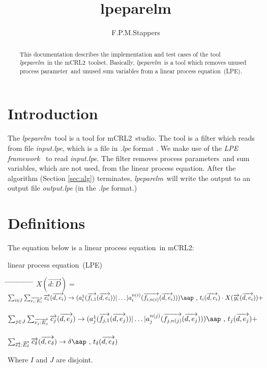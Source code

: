 \documentclass[a4paper,10pt]{article}
\title{lpeparelm}
\author{F.P.M.Stappers}
\theoremstyle{plain}
\theoremstyle{definition}
\newcommand{\mcrl}{mCRL2}
\newcommand{\lpe}{linear process equation}
\newcommand{\tool}{\textit{lpeparelm}}
\newcommand{\ti}{\textit}
\newcommand{\ovr}{\overrightarrow}
\newcommand{\pp}{process parameter}
\newcommand{\pps}{process parameters}
\newcommand{\framework}{\textit{LPE framework} \cite{LPEframework}}
\newcommand{\tab}{\hspace*{5.mm} \= \hspace*{5.mm} \= \hspace*{5.mm} \= \hspace*{5.mm} \= \hspace*{5.mm} \= \hspace*{5.mm}  \= \hspace*{5.mm}  \= \hspace*{5.mm}  \= \hspace*{5.mm} \= \hspace*{5.mm} \= \hspace*{5.mm}  \= \hspace*{5.mm}  \= \hspace*{5.mm}\kill}
\newcommand{\at}[1]{\mbox{\aap ,} #1}
\begin{document}
\maketitle

\begin{abstract}
This documentation describes the implementation and test cases of the tool \tool\ in  the \mcrl\ toolset.
Basically, \tool\ is a tool which removes unused \pp\ and unused sum variables from a \lpe\ (LPE).
\end{abstract}

\tableofcontents

\section{Introduction}
The \tool\ tool is a tool for \mcrl\ studio. The tool is a
filter which reads from file \ti{input.lpe}, which is
a file in \ti{.lpe} format \cite{LPEformat}. We make use of the
\framework\ to read \ti{input.lpe}. The filter removes \pps\ and sum variables, which are not used, from the
\lpe. After the algorithm (Section \ref{sec:alg}) terminates, \tool\
will write the output to an output file \ti{output.lpe} (in the \ti{.lpe} format.)


\section{Definitions} \label{sec:def}

The equation below is a \lpe\ in \mcrl : 
\begin{defn}\lpe\ (LPE) \newline
\begin{tabbing}
\tab
$X (\ovr{d: D}) = $ \> \> \> $ \sum_{i \in I} \sum_{\ovr{e_i: E_i}} \ovr{c_i} ( \ovr{d, e_i }) \rightarrow 
(a_i^1 (\ovr{f_{i,1}}(\ovr{d,e_i})) \vert \ldots \vert a_i^{n(i)}(\ovr{f_{i,n(i)}}(\ovr{d,e_i}))) \at \text{ } t_i(\ovr{d,e_i})  \cdot X(\ovr{g_i}(\ovr{d,e_i})) +$ \\ \\
\> \> \> $ \sum_{j \in J} \sum_{\ovr{e_j: E_j}} \ovr{c_j} ( \ovr{d, e_j} ) \rightarrow 
(a_j^1 (\ovr{f_{j,1}}(\ovr{d,e_j})) \vert \ldots \vert a_j^{n(j)}(\ovr{f_{j,n(j)}}(\ovr{d,e_j}))) \at \text{ } t_j(\ovr{d,e_j}) + $ \\ \\
\> \> \> $\sum_{\ovr{e_\delta}:\ovr{E_\delta}} \ovr{c_\delta} ( \ovr{d, e_\delta}) \rightarrow 
\delta \at \text{ } t_\delta(\ovr{d,e_\delta})$ 
\end{tabbing}

Where $I$ and $J$ are disjoint.\\
\end{defn}
\end{document}
